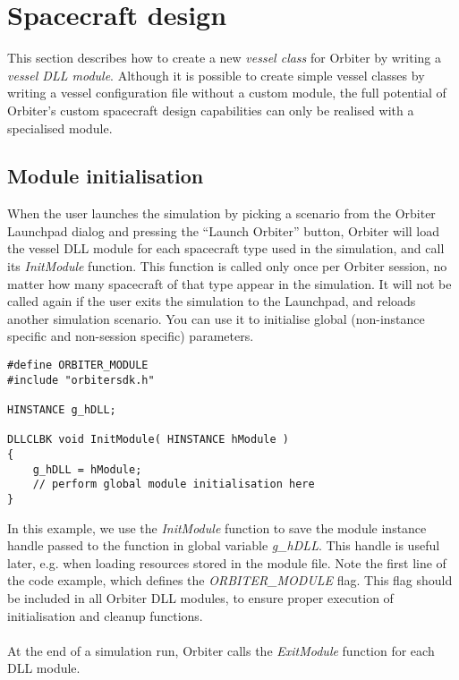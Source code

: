 \documentclass[Orbiter Developer Manual.tex]{subfiles}
\begin{document}
\section{Spacecraft design}
This section describes how to create a new \textit{vessel class} for Orbiter by writing a \textit{vessel DLL module}. Although it is possible to create simple vessel classes by writing a vessel configuration file without a custom module, the full potential of Orbiter’s custom spacecraft design capabilities can only be realised with a specialised module.\\



\subsection{Module initialisation}
When the user launches the simulation by picking a scenario from the Orbiter Launchpad dialog and pressing the “Launch Orbiter” button, Orbiter will load the vessel DLL module for each spacecraft type used in the simulation, and call its \textit{InitModule} function. This function is called only once per Orbiter session, no matter how many spacecraft of that type appear in the simulation. It will not be called again if the user exits the simulation to the Launchpad, and reloads another simulation scenario. You can use it to initialise global (non-instance specific and non-session specific) parameters.

\begin{lstlisting}
#define ORBITER_MODULE
#include "orbitersdk.h"

HINSTANCE g_hDLL;

DLLCLBK void InitModule( HINSTANCE hModule )
{
	g_hDLL = hModule;
	// perform global module initialisation here
}
\end{lstlisting}

\noindent
In this example, we use the \textit{InitModule} function to save the module instance handle passed to the function in global variable \textit{g\_hDLL}. This handle is useful later, e.g. when loading resources stored in the module file. Note the first line of the code example, which defines the \textit{ORBITER\_MODULE} flag. This flag should be included in all Orbiter DLL modules, to ensure proper execution of initialisation and cleanup functions.\\
\\
At the end of a simulation run, Orbiter calls the \textit{ExitModule} function for each DLL module.
\end{document}
